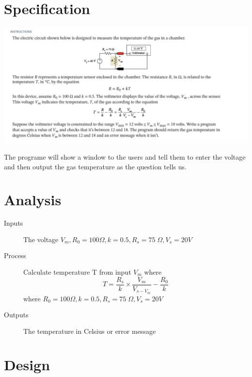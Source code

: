 \documentclass{article}
\begin{document}
	
\section*{Specification}
\includegraphics[scale=0.7]{lab2.png}
\begin{description}
	\item The programe will show a window to the users and tell them to enter the voltage and then output the gas temperature as the question tells us.
\end{description}


\newpage\section*{Analysis}
\begin{description}
	\item [Inputs]  The voltage $V_{m},R_{0} = 100 \Omega, k = 0.5,R_{s} = 75 \; \Omega, V_{s} = 20 V $
	\item [Process]  Calculate temperature T from input $V_{m}$
	where \[ T =\frac{R_{s}}{k} \times \frac{V_{m}}{V_{s - V_{m}}}
	   - \frac{R_{0}}{k} \]
	   where $R_{0} = 100 \Omega, k = 0.5,R_{s} = 75 \; \Omega, V_{s} = 20 V $
    \item [Outputs]  The temperature in Celsius or error message
\end{description}

\newpage\section*{Design}
\end{document}

